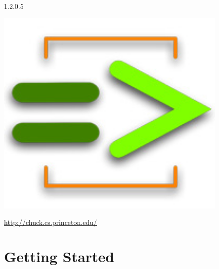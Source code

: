 \documentclass[11pt]{report}
\begin{document}
\thispagestyle{coverplain}
\vskip 6in
{\huge


}

\begin{center}
 1.2.0.5
\end{center}
\vskip 1.5in
\begin{center}
  \includegraphics[height=4in]{images/chuck_logo2.jpg}

  \vskip 1in

  \Large{\href{http://chuck.cs.princeton.edu/}{http://chuck.cs.princeton.edu/}}
\end{center}

\newpage







\tableofcontents
\clearpage

\pagestyle{fancy}

\part*{Getting Started}
\end{document}
